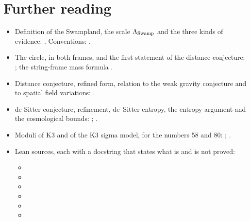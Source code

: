 \section*{Further reading}
\begin{itemize}[leftmargin=*,itemsep=1pt]
\item Definition of the Swampland, the scale $\Lambda_{\rm Swamp}$ and the three kinds of
 evidence: . Conventions: .
\item The circle, in both frames, and the first statement of the distance conjecture:
 ; the string-frame mass formula .
\item Distance conjecture, refined form, relation to the weak gravity conjecture and to spatial
 field variations: .
\item de Sitter conjecture, refinement, de~Sitter entropy, the entropy argument and the
 cosmological bounds: ; .
\item Moduli of K3 and of the K3 sigma model, for the numbers 58 and 80:
 ; .
\item Lean sources, each with a docstring that states what is and is not proved:
 \begin{itemize}[leftmargin=*,itemsep=0pt]
 \item {}
 \item {}
 \item {}
 \item {}
 \item {}
 \item {}
 \end{itemize}
\end{itemize}
